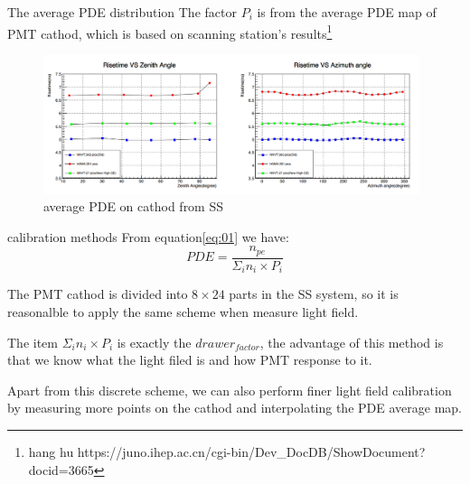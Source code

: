 \documentclass[11pt,compress,xcolor=x11names,UTF8]{beamer}
\begin{document}
\begin{frame}{The average PDE distribution}
The factor $P_i$ is from the average PDE map of PMT cathod, which is based on scanning station's results\footnote{hang hu \rightarrow https://juno.ihep.ac.cn/cgi-bin/Dev\_DocDB/ShowDocument?docid=3665}

\begin{figure}
\centering
\includegraphics[width=0.98\textwidth]{pdecathod} %
\caption{average PDE on cathod from SS}
\end{figure}

\end{frame}
\begin{frame}{calibration methods}
From equation\ref{eq:01} we have:
\begin{equation}
PDE=\frac{n_{pe}}{\Sigma_{i} n_{i}\times P_{i}}
\end{equation}

The PMT cathod is divided into $8\times 24$ parts in the SS system, so it is reasonalble to apply the same scheme when measure light field. 

\vspace{.5cm}

The item $\Sigma_{i} n_{i}\times P_{i}$ is exactly the $drawer_{factor}$, the advantage of this method is that we know what the light filed is and how PMT response to it.

\vspace{.5cm}

Apart from this discrete scheme, we can also perform finer light field calibration by measuring more points on the cathod and interpolating the PDE average map.

\end{frame}
\end{document}
